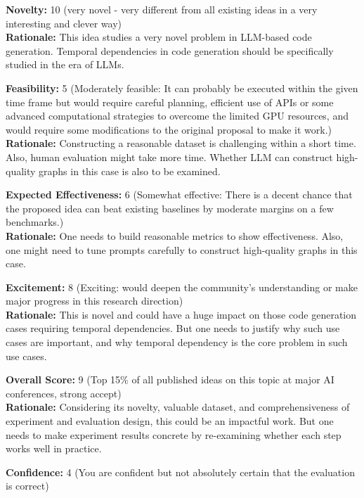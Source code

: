 \begin{tcolorbox}[colback=green!10!white, colframe=green!80!black, title=\textbf{Reviewer 3}]
\small
\textbf{Novelty:} 10 (very novel - very different from all existing ideas in a very interesting and clever way)\\
\textbf{Rationale:} This idea studies a very novel problem in LLM-based code generation. Temporal dependencies in code generation should be specifically studied in the era of LLMs.

\vspace{10pt}

\textbf{Feasibility:} 5 (Moderately feasible: It can probably be executed within the given time frame but would require careful planning, efficient use of APIs or some advanced computational strategies to overcome the limited GPU resources, and would require some modifications to the original proposal to make it work.)\\
\textbf{Rationale:} Constructing a reasonable dataset is challenging within a short time. Also, human evaluation might take more time. Whether LLM can construct high-quality graphs in this case is also to be examined.

\vspace{10pt}

\textbf{Expected Effectiveness:} 6 (Somewhat effective: There is a decent chance that the proposed idea can beat existing baselines by moderate margins on a few benchmarks.)\\
\textbf{Rationale:} One needs to build reasonable metrics to show effectiveness. Also, one might need to tune prompts carefully to construct high-quality graphs in this case.

\vspace{10pt}

\textbf{Excitement:} 8 (Exciting: would deepen the community's understanding or make major progress in this research direction)\\
\textbf{Rationale:} This is novel and could have a huge impact on those code generation cases requiring temporal dependencies. But one needs to justify why such use cases are important, and why temporal dependency is the core problem in such use cases.

\vspace{10pt}

\textbf{Overall Score:} 9 (Top 15\% of all published ideas on this topic at major AI conferences, strong accept)\\
\textbf{Rationale:} Considering its novelty, valuable dataset, and comprehensiveness of experiment and evaluation design, this could be an impactful work. But one needs to make experiment results concrete by re-examining whether each step works well in practice.

\vspace{10pt}

\textbf{Confidence:} 4 (You are confident but not absolutely certain that the evaluation is correct)
\end{tcolorbox}



